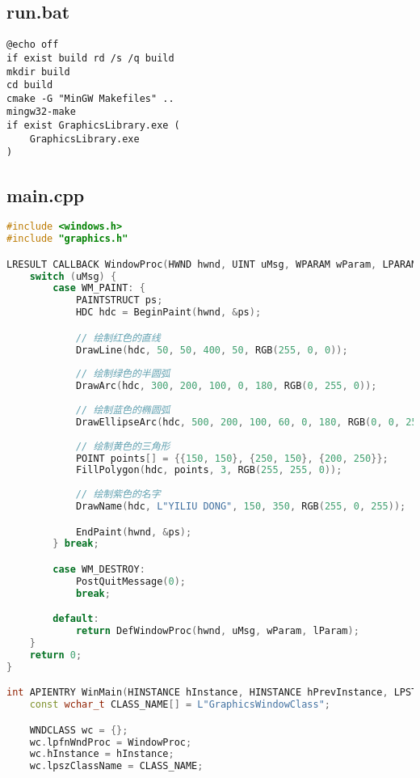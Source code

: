 \documentclass[11pt,a4paper]{article}
\begin{document}
\subsection{run.bat}
\begin{lstlisting}[language=Batch]
@echo off
if exist build rd /s /q build
mkdir build
cd build
cmake -G "MinGW Makefiles" ..
mingw32-make
if exist GraphicsLibrary.exe (
    GraphicsLibrary.exe
)

\end{lstlisting}

\subsection{main.cpp}
\begin{lstlisting}[language=C++]
#include <windows.h>
#include "graphics.h"

LRESULT CALLBACK WindowProc(HWND hwnd, UINT uMsg, WPARAM wParam, LPARAM lParam) {
    switch (uMsg) {
        case WM_PAINT: {
            PAINTSTRUCT ps;
            HDC hdc = BeginPaint(hwnd, &ps);

            // 绘制红色的直线
            DrawLine(hdc, 50, 50, 400, 50, RGB(255, 0, 0));
            
            // 绘制绿色的半圆弧
            DrawArc(hdc, 300, 200, 100, 0, 180, RGB(0, 255, 0));
            
            // 绘制蓝色的椭圆弧
            DrawEllipseArc(hdc, 500, 200, 100, 60, 0, 180, RGB(0, 0, 255));
            
            // 绘制黄色的三角形
            POINT points[] = {{150, 150}, {250, 150}, {200, 250}};
            FillPolygon(hdc, points, 3, RGB(255, 255, 0));
            
            // 绘制紫色的名字
            DrawName(hdc, L"YILIU DONG", 150, 350, RGB(255, 0, 255));

            EndPaint(hwnd, &ps);
        } break;

        case WM_DESTROY:
            PostQuitMessage(0);
            break;

        default:
            return DefWindowProc(hwnd, uMsg, wParam, lParam);
    }
    return 0;
}

int APIENTRY WinMain(HINSTANCE hInstance, HINSTANCE hPrevInstance, LPSTR lpCmdLine, int nCmdShow) {
    const wchar_t CLASS_NAME[] = L"GraphicsWindowClass";

    WNDCLASS wc = {};
    wc.lpfnWndProc = WindowProc;
    wc.hInstance = hInstance;
    wc.lpszClassName = CLASS_NAME;


\end{lstlisting}
\end{document}
